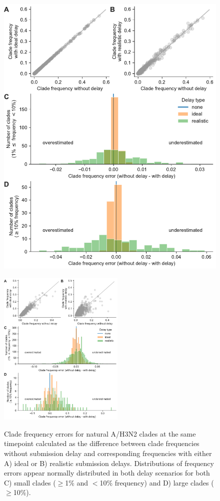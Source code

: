 \documentclass[9pt,lineno]{elife}
\begin{document}
\begin{figure}[htb]
\includegraphics[width=\linewidth]{figures/h3n2_current_frequency_errors_by_delay}
\caption{Clade frequency errors for natural A/H3N2 clades at the same timepoint calculated as the difference between clade frequencies without submission delay and corresponding frequencies with either A) ideal or B) realistic submission delays.
Distributions of frequency errors appear normally distributed in both delay scenarios for both C) small clades ($\ge$1\% and $<$10\% frequency) and D) large clades ($\ge$10\%).}
\label{fig:h3n2_current_clade_frequency_errors}
%
{\includegraphics[width=6cm]{figures/simulated_current_frequency_errors_by_delay}}\label{figsupp:simulated_current_clade_frequency_errors}

\end{figure}
\end{document}
